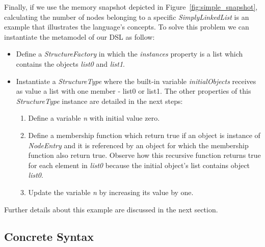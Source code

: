 Finally, if we use the memory snapshot depicted in Figure~\ref{fig:simple_snapshot}, calculating the number of nodes belonging to a specific \textit{SimplyLinkedList} is an example that illustrates the language's concepts.
To solve this problem we can instantiate the metamodel of our DSL as follow:
\begin{itemize}
\item Define a \textit{StructureFactory} in which the \textit{instances} property is a list which contains the objects \textit{list0} and \textit{list1}.
\item Instantiate a \textit{StructureType} where the built-in variable \textit{initialObjects} receives as value a list with one member - list0 or list1.
      The other properties of this \textit{StructureType} instance are detailed in the next steps: 
      \begin{enumerate}
      \item Define a variable \textit{n} with initial value zero.
      \item Define a membership function which return true if an object is instance of \textit{NodeEntry} and it is referenced by an object for which the membership function also return true. Observe how this recursive function returns true for each element in \textit{list0} because the initial object's list contains object \textit{list0}. 
      \item Update the variable \textit{n} by increasing its value by one.
      \end{enumerate}  
\end{itemize}
Further details about this example are discussed in the next section.

\subsection{Concrete Syntax}\label{sec:concrete-syntax}

